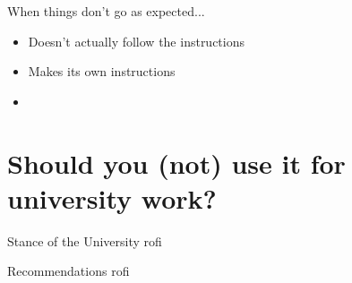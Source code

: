 \documentclass[aspectratio=169,hyperref={unicode}]{beamer}
\begin{document}
\begin{frame}{When things don't go as expected...}
	\begin{itemize}
		\item Doesn't actually follow the instructions
		\item Makes its own instructions
		\item 
	\end{itemize}
\end{frame}


\section{Should you (not) use it for university work?}

\begin{frame}{Stance of the University}
	rofi
\end{frame}

\begin{frame}{Recommendations}
	rofi
\end{frame}
\end{document}
